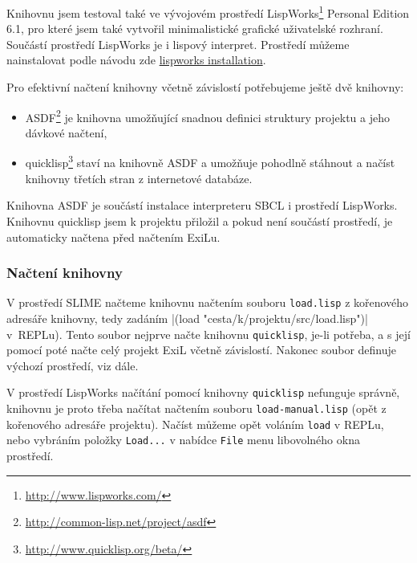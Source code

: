 Knihovnu jsem testoval také ve vývojovém prostředí
LispWorks\registered\footnote{\url{http://www.lispworks.com/}} Personal Edition 6.1,
pro které jsem také vytvořil minimalistické grafické uživatelské rozhraní.
Součástí prostředí LispWorks je i lispový interpret. Prostředí můžeme nainstalovat
podle návodu zde \url{lispworks installation}.

Pro efektivní načtení knihovny včetně závislostí potřebujeme ještě dvě knihovny:
\begin{itemize}
  \item ASDF\footnote{\url{http://common-lisp.net/project/asdf}} je knihovna
    umožňující snadnou definici struktury projektu a jeho dávkové načtení,
  \item quicklisp\footnote{\url{http://www.quicklisp.org/beta/}} staví na knihovně
    ASDF a umožňuje pohodlně stáhnout a načíst knihovny třetích stran z internetové
    databáze.
\end{itemize}
Knihovna ASDF je součástí instalace interpreteru SBCL i prostředí LispWorks.
Knihovnu quicklisp jsem k projektu přiložil a pokud není součástí prostředí, je
automaticky načtena před načtením ExiLu.
\subsubsection{Načtení knihovny}
V prostředí SLIME načteme knihovnu načtením souboru \verb|load.lisp| z kořenového
adresáře knihovny, tedy zadáním \cl|(load "cesta/k/projektu/src/load.lisp")|
v~REPLu). Tento soubor nejprve načte knihovnu \verb|quicklisp|, je-li potřeba,
a s její pomocí poté načte celý projekt ExiL včetně závislostí. Nakonec soubor
definuje výchozí prostředí, viz dále.

V prostředí LispWorks načítání pomocí knihovny \verb|quicklisp| nefunguje správně,
knihovnu je proto třeba načítat načtením souboru \verb|load-manual.lisp| (opět
z kořenového adresáře projektu). Načíst můžeme opět voláním \verb|load| v REPLu,
nebo vybráním položky \verb|Load...| v nabídce \verb|File| menu libovolného okna
prostředí.
